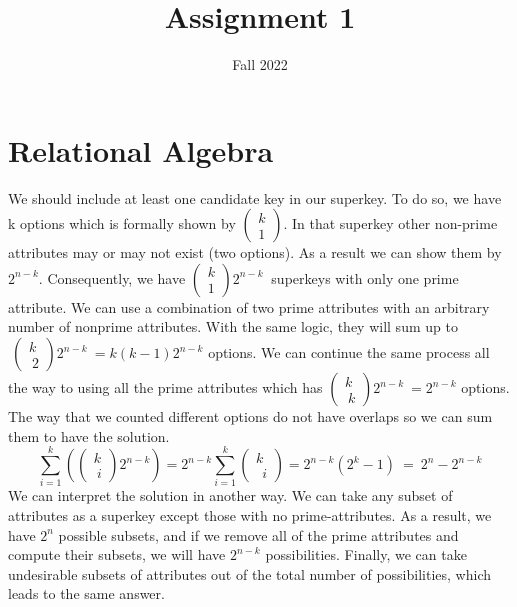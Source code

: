 \documentclass{homework}
\author{}
\date{Fall 2022}
\title{Assignment 1}
\begin{document}
 \maketitle

\section*{Relational Algebra}
\question We should include at least one candidate key in our superkey. To do so, we have k options which is formally shown by $\begin{pmatrix}k\\ 1\end{pmatrix}$. In that superkey other non-prime attributes may or may not exist (two options). As a result we can show them by $2^{n-k}$. Consequently, we have $\begin{pmatrix}k\\ 1\end{pmatrix}2^{n-k}\:$ superkeys with only one prime attribute. We can use a combination of two prime attributes with an arbitrary number of nonprime attributes. With the same logic, they will sum up to $\:\begin{pmatrix}k\\ \:2\end{pmatrix}2^{n-k}\:=k\left(k-1\right)2^{n-k}$ options. We can continue the same process all the way to using all the prime attributes which has $\begin{pmatrix}k\\ \:k\end{pmatrix}2^{n-k}\:=2^{n-k}$ options. The way that we counted different options do not have overlaps so we can sum them to have the solution.
\[\sum _{i=1}^k\left(\begin{pmatrix}k\\ \:i\end{pmatrix}2^{n-k}\right)=2^{n-k}\sum ^k_{i=1}\begin{pmatrix}k\\ \:\:i\end{pmatrix}=2^{n-k}\left(2^k-1\right)\:=\:2^n-2^{n-k}\]
We can interpret the solution in another way. We can take any subset of attributes as a superkey except those with no prime-attributes. As a result, we have $2^n$ possible subsets, and if we remove all of the prime attributes and compute their subsets, we will have $2^{n-k}$ possibilities. Finally, we can take undesirable subsets of attributes out of the total number of possibilities, which leads to the same answer.
\end{document}
